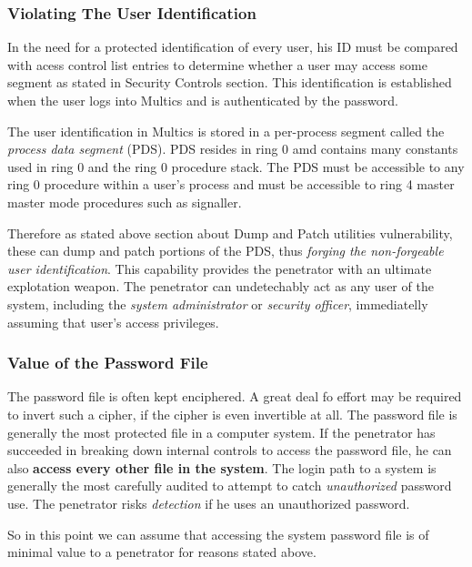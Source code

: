 \subsubsection{Violating The User Identification}

In the need for a protected identification of every user, his ID must be compared with acess control list entries 
to determine whether a user may access some segment as stated in Security Controls section.
This identification is established when the user logs into Multics and is authenticated by the password.

The user identification in Multics is stored in a per-process segment called the \textit{process data segment} (PDS).
PDS resides in ring 0 amd contains many constants used in ring 0 and the ring 0 procedure stack. The PDS must be 
accessible to any ring 0 procedure within a user's process and must be accessible to ring 4 master master mode 
procedures such as signaller.

Therefore as stated above section about Dump and Patch utilities vulnerability, these can dump and patch portions of the 
PDS, thus \textit{forging the non-forgeable user identification}.
This capability provides the penetrator with an ultimate explotation weapon. The penetrator can undetechably act as any 
user of the system, including the \textit{system administrator} or \textit{security officer}, immediatelly assuming that 
user's access privileges.

\subsubsection{Value of the Password File}

The password file is often kept enciphered. A great deal fo effort may be required to invert such a cipher, if the cipher 
is even invertible at all.
The password file is generally the most protected file in a computer system. If the penetrator has succeeded in breaking 
down internal controls to access the password file, he can also \textbf{access every other file in the system}.
The login path to a system is generally the most carefully audited to attempt to catch \textit{unauthorized} password use.
The penetrator risks \textit{detection} if he uses an unauthorized password.

So in this point we can assume that accessing the system password file is of minimal value to a penetrator for reasons 
stated above.


